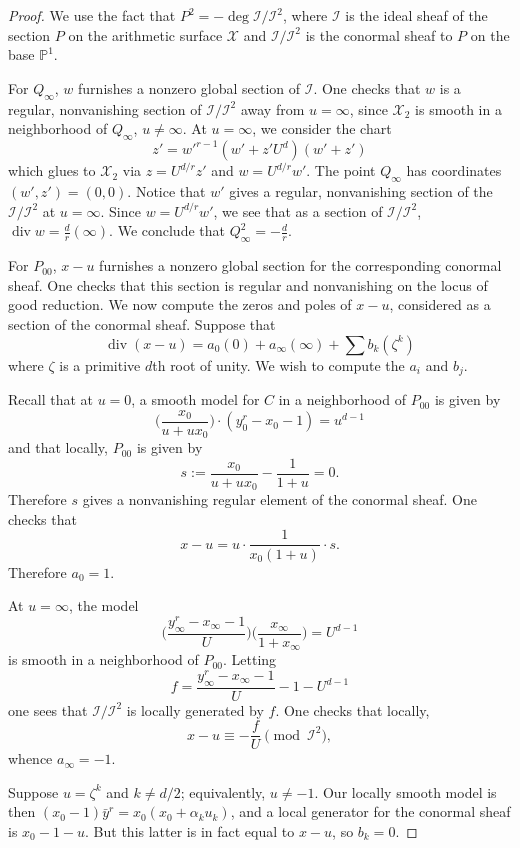 \documentclass[reqno]{amsart}
\theoremstyle{definition}
\theoremstyle{remark}
\DeclareMathOperator{\dvsr}{div}
\def \PP {{\mathbb P}^1}
\def\II{\mathcal{I}}
\def\XX{\mathcal{X}}
\begin{document}
\begin{proof}
  We use the fact that $P^2 = - \deg \II/\II^2$, where $\II$ is the ideal sheaf of the section $P$ on the arithmetic surface $\XX$ and $\II/\II^2$ is the conormal sheaf to $P$ on the base $\PP$. 

For $Q_\infty$, $w$ furnishes a nonzero global section of $\II$. One checks that $w$ is a regular, nonvanishing section of $\II/\II^2$ away from $u = \infty$, since $\XX_2$ is smooth in a neighborhood of $Q_\infty$, $u \neq \infty$. At $u = \infty$, we consider the chart
  \[
  z' = w'^{r-1}(w'+z'U^d)(w'+z')
  \]
  which glues to $\XX_2$ via $z = U^{d/r} z'$ and $w = U^{d/r} w'$. The point $Q_\infty$ has coordinates $(w', z') = (0,0)$. Notice that $w'$ gives a regular, nonvanishing section of the $\II/\II^2$ at $u = \infty$. Since $w = U^{d/r} w'$, we see that as a section of $\II/\II^2$, $\dvsr w = \frac{d}{r}(\infty)$. We conclude that $Q_\infty^2 = -\frac{d}{r}$.

For $P_{00}$, $x-u$ furnishes a nonzero global section for the corresponding conormal sheaf. One checks that this section is regular and nonvanishing on the locus of good reduction. We now compute the zeros and poles of $x-u$, considered as a section of the conormal sheaf. Suppose that
\[
\dvsr (x-u) = a_0 (0) + a_\infty (\infty) + \sum b_k (\zeta^k)
\]
where $\zeta$ is a primitive $d$th root of unity. We wish to compute the $a_i$ and $b_j$.

Recall that at $u=0$, a smooth model for $C$ in a neighborhood of $P_{00}$ is given by
\[
\bigg(\frac{x_0}{u + ux_0}\bigg) \cdot (y_0^r - x_0 - 1) = u^{d-1}
\]
and that locally, $P_{00}$ is given by
\[
s := \frac{x_0}{u+ux_0} - \frac{1}{1+u} = 0.
\]
Therefore $s$ gives a nonvanishing regular element of the conormal sheaf. One checks that
\[
x - u = u \cdot \frac{1}{x_0(1+u)} \cdot s.
\]
Therefore $a_0 = 1$.

At $u = \infty$, the model
\[
\bigg(\frac{y_\infty^r - x_\infty - 1}{U}\bigg)\bigg(\frac{x_\infty}{1 + x_\infty}\bigg) = U^{d-1}
\]
is smooth in a neighborhood of $P_{00}$. Letting
\[
f = \frac{y_\infty^r - x_\infty - 1}{U} - 1 - U^{d-1}
\]
one sees that $\II/\II^2$ is locally generated by $f$. One checks that locally,
\[
x - u \equiv -\frac{f}{U} \pmod{\II^2},
\]
whence $a_\infty = -1$.

Suppose $u = \zeta^k$ and $k \neq d/2$; equivalently, $u \neq -1$. Our locally smooth model is then $(x_0 - 1)\bar{y}^r = x_0(x_0 + \alpha_k u_k)$, and a local generator for the conormal sheaf is $x_0 - 1 - u$. But this latter is in fact equal to $x - u$, so $b_k = 0$.


\end{proof}
\end{document}
